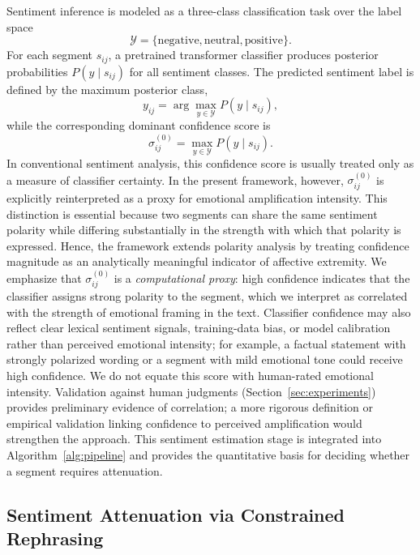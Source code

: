 \documentclass[final,1p,times]{elsarticle}
\begin{document}
Sentiment inference is modeled as a three-class classification task over the label space
\begin{equation}
\mathcal{Y} = \{\mathrm{negative}, \mathrm{neutral}, \mathrm{positive}\}.
\end{equation}
For each segment $s_{ij}$, a pretrained transformer classifier produces posterior probabilities $P(y \mid s_{ij})$ for all sentiment classes. The predicted sentiment label is defined by the maximum posterior class,
\begin{equation}
y_{ij} = \arg\max_{y \in \mathcal{Y}} P(y \mid s_{ij}),
\end{equation}
while the corresponding dominant confidence score is
\begin{equation}
\sigma^{(0)}_{ij} = \max_{y \in \mathcal{Y}} P(y \mid s_{ij}).
\end{equation}
In conventional sentiment analysis, this confidence score is usually treated only as a measure of classifier certainty. In the present framework, however, $\sigma^{(0)}_{ij}$ is explicitly reinterpreted as a proxy for emotional amplification intensity. This distinction is essential because two segments can share the same sentiment polarity while differing substantially in the strength with which that polarity is expressed. Hence, the framework extends polarity analysis by treating confidence magnitude as an analytically meaningful indicator of affective extremity. We emphasize that $\sigma^{(0)}_{ij}$ is a \emph{computational proxy}: high confidence indicates that the classifier assigns strong polarity to the segment, which we interpret as correlated with the strength of emotional framing in the text. Classifier confidence may also reflect clear lexical sentiment signals, training-data bias, or model calibration rather than perceived emotional intensity; for example, a factual statement with strongly polarized wording or a segment with mild emotional tone could receive high confidence. We do not equate this score with human-rated emotional intensity. Validation against human judgments (Section~\ref{sec:experiments}) provides preliminary evidence of correlation; a more rigorous definition or empirical validation linking confidence to perceived amplification would strengthen the approach. This sentiment estimation stage is integrated into Algorithm~\ref{alg:pipeline} and provides the quantitative basis for deciding whether a segment requires attenuation.

\subsection{Sentiment Attenuation via Constrained Rephrasing}
\end{document}
